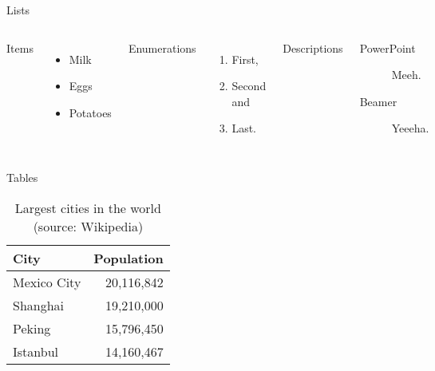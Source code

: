 \documentclass{kw}
\begin{document}
\begin{frame}{Lists}
	\begin{columns}[T,onlytextwidth]
		Items
		\begin{itemize}
			\item Milk \item Eggs \item Potatoes
		\end{itemize}
		
		Enumerations
		\begin{enumerate}
			\item First, \item Second and \item Last.
		\end{enumerate}
		
		Descriptions
		\begin{description}
			\item[PowerPoint] Meeh. \item[Beamer] Yeeeha.
		\end{description}
	\end{columns}
\end{frame}
\begin{frame}{Tables}
	\begin{table}
		\caption{Largest cities in the world (source: Wikipedia)}
		\begin{tabular}{@{} lr @{}}
			\toprule
			City & Population\\
			\midrule
			Mexico City & 20,116,842\\
			Shanghai & 19,210,000\\
			Peking & 15,796,450\\
			Istanbul & 14,160,467\\
			\bottomrule
		\end{tabular}
	\end{table}
\end{frame}
\end{document}
